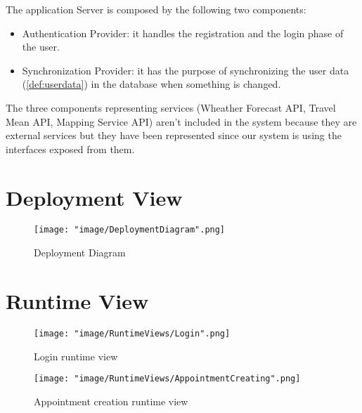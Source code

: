 The application Server is composed by the following two components:
\begin{itemize}

\item Authentication Provider: it handles the registration and the login phase of the user. 

\item Synchronization Provider: it has the purpose of synchronizing the user data (\ref{def:userdata}) in the database when something is changed.
 
\end{itemize}

The three components representing services (Wheather Forecast API, Travel Mean API, Mapping Service API) aren't included in the system because they are external services but they have been represented since our system is using the interfaces exposed from them.

\section{Deployment View}

\begin{figure}[H]
\begin{center}
\texttt{[image: "image/DeploymentDiagram".png]}
\caption{Deployment Diagram}
\end{center}
\end{figure}

\section{Runtime View}

\begin{figure}[H]
\begin{center}
\texttt{[image: "image/RuntimeViews/Login".png]}
\caption{Login runtime view}
\end{center}
\end{figure}

\begin{figure}[H]
\begin{center}
\texttt{[image: "image/RuntimeViews/AppointmentCreating".png]}
\caption{Appointment creation runtime view}
\end{center}
\end{figure}

